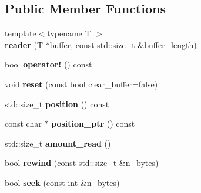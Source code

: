 \subsection*{Public Member Functions}
\begin{DoxyCompactItemize}
\item 
\hypertarget{classstrtk_1_1binary_1_1reader_a45742996f92e8427315a86e4506d13bd}{{\footnotesize template$<$typename T $>$ }\\{\bfseries reader} (T $\ast$buffer, const std\-::size\-\_\-t \&buffer\-\_\-length)}\label{classstrtk_1_1binary_1_1reader_a45742996f92e8427315a86e4506d13bd}

\item 
\hypertarget{classstrtk_1_1binary_1_1reader_ad667e2fa0a8c4b956232c015f4195fb1}{bool {\bfseries operator!} () const }\label{classstrtk_1_1binary_1_1reader_ad667e2fa0a8c4b956232c015f4195fb1}

\item 
\hypertarget{classstrtk_1_1binary_1_1reader_a4730baa0d2576783eefc1b0a4f91d6ab}{void {\bfseries reset} (const bool clear\-\_\-buffer=false)}\label{classstrtk_1_1binary_1_1reader_a4730baa0d2576783eefc1b0a4f91d6ab}

\item 
\hypertarget{classstrtk_1_1binary_1_1reader_a591cd0d8a83fd91fe176c3a300235b16}{std\-::size\-\_\-t {\bfseries position} () const }\label{classstrtk_1_1binary_1_1reader_a591cd0d8a83fd91fe176c3a300235b16}

\item 
\hypertarget{classstrtk_1_1binary_1_1reader_a49ed4f2141cf741afcb82bfc9c18f8ac}{const char $\ast$ {\bfseries position\-\_\-ptr} () const }\label{classstrtk_1_1binary_1_1reader_a49ed4f2141cf741afcb82bfc9c18f8ac}

\item 
\hypertarget{classstrtk_1_1binary_1_1reader_a72e1a96be625c8d242ddd92c2a0db820}{std\-::size\-\_\-t {\bfseries amount\-\_\-read} ()}\label{classstrtk_1_1binary_1_1reader_a72e1a96be625c8d242ddd92c2a0db820}

\item 
\hypertarget{classstrtk_1_1binary_1_1reader_a0245de8d93c3a1f43a01d73e547d4f80}{bool {\bfseries rewind} (const std\-::size\-\_\-t \&n\-\_\-bytes)}\label{classstrtk_1_1binary_1_1reader_a0245de8d93c3a1f43a01d73e547d4f80}

\item 
\hypertarget{classstrtk_1_1binary_1_1reader_ae3e050128cf04fc9f8fe1b92c8ec2c86}{bool {\bfseries seek} (const int \&n\-\_\-bytes)}\label{classstrtk_1_1binary_1_1reader_ae3e050128cf04fc9f8fe1b92c8ec2c86}


\end{DoxyCompactItemize}
